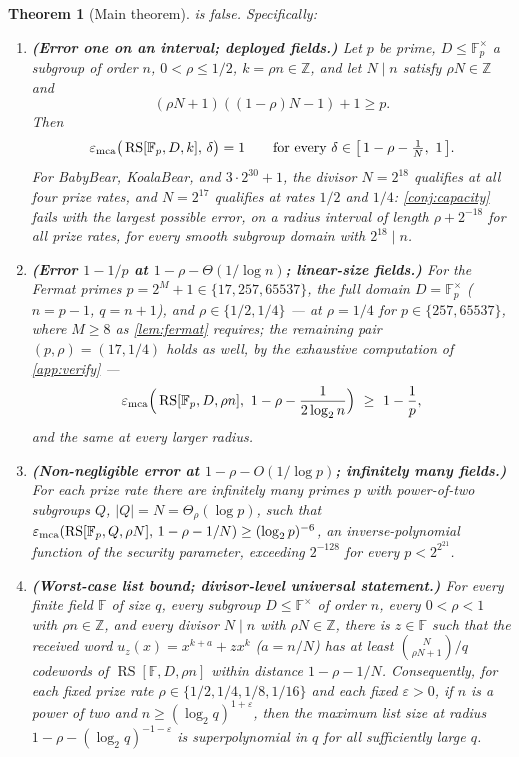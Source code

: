 \documentclass[11pt]{article}
\newtheorem{theorem}{Theorem}[section]
\theoremstyle{definition}
\newcommand{\F}{\mathbb F}
\newcommand{\Z}{\mathbb Z}
\newcommand{\RS}{\operatorname{RS}}
\newcommand{\eps}{\varepsilon}
\begin{document}
\begin{theorem}[Main theorem]\label{thm:main}
 is false.  Specifically:
\begin{enumerate}[label=(\alph*),leftmargin=2.2em]
\item \textbf{(Error one on an interval; deployed fields.)}
Let $p$ be prime, $D\le\F_p^\times$ a subgroup of order $n$, $0<\rho\le1/2$, $k=\rho n\in\Z$, and let $N\mid n$ satisfy $\rho N\in\Z$ and
\[
        (\rho N+1)((1-\rho)N-1)+1\ge p .
\]
Then
\[
        \eps_{\rm mca}\big(\RS[\F_p,D,k],\,\delta\big)=1
        \qquad\text{for every }\delta\in\big[\,1-\rho-\tfrac1N,\ 1\,\big].
\]
For BabyBear, KoalaBear, and $3\cdot2^{30}+1$, the divisor $N=2^{18}$ qualifies at all four prize rates, and $N=2^{17}$ qualifies at rates $1/2$ and $1/4$: \cref{conj:capacity} fails with the largest possible error, on a radius interval of length $\rho+2^{-18}$ for all prize rates, for every smooth subgroup domain with $2^{18}\mid n$.
\item \textbf{(Error $1-1/p$ at $1-\rho-\Theta(1/\log n)$; linear-size fields.)}
For the Fermat primes $p=2^M+1\in\{17,257,65537\}$, the full domain $D=\F_p^\times$ ($n=p-1$, $q=n+1$), and $\rho\in\{1/2,1/4\}$ --- at $\rho=1/4$ for $p\in\{257,65537\}$, where $M\ge8$ as \cref{lem:fermat} requires; the remaining pair $(p,\rho)=(17,1/4)$ holds as well, by the exhaustive computation of \cref{app:verify} ---
\[
        \eps_{\rm mca}\Big(\RS[\F_p,D,\rho n],\ 1-\rho-\frac{1}{2\log_2 n}\Big)\ \ge\ 1-\frac1p ,
\]
and the same at every larger radius.
\item \textbf{(Non-negligible error at $1-\rho-O(1/\log p)$; infinitely many fields.)}
For each prize rate there are infinitely many primes $p$ with power-of-two subgroups $Q$, $|Q|=N=\Theta_\rho(\log p)$, such that $\eps_{\rm mca}(\RS[\F_p,Q,\rho N],\,1-\rho-1/N)\ge(\log_2p)^{-6}$, an inverse-polynomial function of the security parameter, exceeding $2^{-128}$ for every $p<2^{2^{21}}$.
\item \textbf{(Worst-case list bound; divisor-level universal statement.)}
For every finite field $\F$ of size $q$, every subgroup $D\le\F^\times$ of order $n$, every $0<\rho<1$ with $\rho n\in\Z$, and every divisor $N\mid n$ with $\rho N\in\Z$, there is $z\in\F$ such that the received word $u_z(x)=x^{k+a}+zx^k$ ($a=n/N$) has at least $\binom{N}{\rho N+1}/q$ codewords of $\RS[\F,D,\rho n]$ within distance $1-\rho-1/N$.  Consequently, for each fixed prize rate $\rho\in\{1/2,1/4,1/8,1/16\}$ and each fixed $\eps>0$, if $n$ is a power of two and $n\ge (\log_2q)^{1+\eps}$, then the maximum list size at radius $1-\rho-(\log_2q)^{-1-\eps}$ is superpolynomial in $q$ for all sufficiently large $q$.
\end{enumerate}
\end{theorem}
\end{document}
